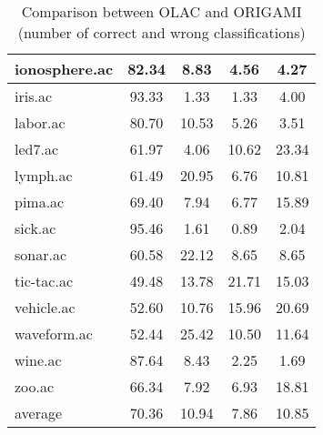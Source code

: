 \begin{table}[htbp]
\begin{tabular}{|l|c|c|c|c|}
		\hline
		ionosphere.ac   & 82.34         & 8.83               & 4.56                     & 4.27                          \\
		\hline
		iris.ac         & 93.33         & 1.33               & 1.33                     & 4.00                          \\
		\hline
		labor.ac        & 80.70         & 10.53              & 5.26                     & 3.51                          \\
		\hline
		led7.ac         & 61.97         & 4.06               & 10.62                    & 23.34                         \\
		\hline
		lymph.ac        & 61.49         & 20.95              & 6.76                     & 10.81                         \\
		\hline
		pima.ac         & 69.40         & 7.94               & 6.77                     & 15.89                         \\
		\hline
		sick.ac         & 95.46         & 1.61               & 0.89                     & 2.04                          \\
		\hline
		sonar.ac        & 60.58         & 22.12              & 8.65                     & 8.65                          \\
		\hline
		tic-tac.ac      & 49.48         & 13.78              & 21.71                    & 15.03                         \\
		\hline
		vehicle.ac      & 52.60         & 10.76              & 15.96                    & 20.69                         \\
		\hline
		waveform.ac     & 52.44         & 25.42              & 10.50                    & 11.64                         \\
		\hline
		wine.ac         & 87.64         & 8.43               & 2.25                     & 1.69                          \\
		\hline
		zoo.ac          & 66.34         & 7.92               & 6.93                     & 18.81                         \\
		\hline
		average         & 70.36         & 10.94              & 7.86                     & 10.85                         \\
		\hline
		\end{tabular}
	\caption{Comparison between OLAC and ORIGAMI (number of correct and wrong classifications)}
	\label{tab:comparison_olac_origami}
\end{table}